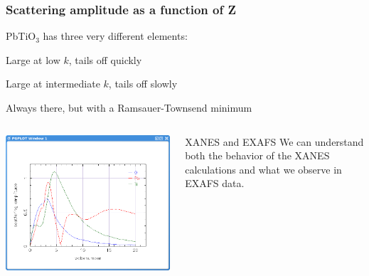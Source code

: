 \begin{frame}
  \frametitle{Scattering amplitude as a function of Z}
  PbTiO$_3$ has three very different elements:
  \begin{description}
  \item[Low Z] Large at low $k$, tails off quickly
  \item[Transition metal] Large at intermediate $k$, tails off slowly
  \item[Heavy metal] Always there, but with a Ramsauer-Townsend minimum
  \end{description}

  \medskip

  \begin{columns}
    \begin{column}{0.6\linewidth}
      \centering\includegraphics[width=0.85\linewidth]{images/PbTiO3/fofk}
    \end{column}
    \begin{column}{0.4\linewidth}
      \begin{block}{XANES and EXAFS}
        We can understand both the behavior of the XANES calculations
        and what we observe in EXAFS data.
    \end{block}
    \end{column}
  \end{columns}
\end{frame}

